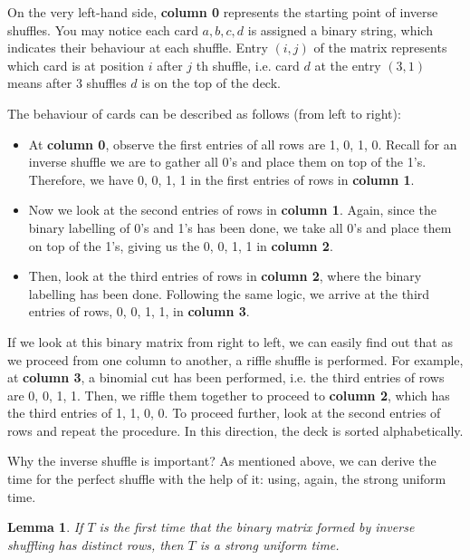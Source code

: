 \documentclass[12pt]{article}
\theoremstyle{plain}
\newtheorem{lemma}{Lemma}
\theoremstyle{definition}
\theoremstyle{remark}
\begin{document}
On the very left-hand side, \textbf{column 0} represents the starting point of inverse shuffles. You may notice each card $a,b,c,d$ is assigned a binary string, which indicates their behaviour at each shuffle. Entry $(i,j)$ of the matrix represents which card is at position $i$ after $j$ th shuffle, i.e. card $d$ at the entry $(3,1)$ means after 3 shuffles $d$ is on the top of the deck.

The behaviour of cards can be described as follows (from left to right): 
\begin{itemize}
    \item At \textbf{column 0}, observe the first entries of all rows are 1, 0, 1, 0. Recall for an inverse shuffle we are to gather all 0's and place them on top of the 1's. Therefore, we have 0, 0, 1, 1 in the first entries of rows in \textbf{column 1}.
    
    \item Now we look at the second entries of rows in \textbf{column 1}. Again, since the binary labelling of 0's and 1's has been done, we take all 0's and place them on top of the 1's, giving us the 0, 0, 1, 1 in \textbf{column 2}. 
    
    \item Then, look at the third entries of rows in \textbf{column 2}, where the binary labelling has been done. Following the same logic, we arrive at the third entries of rows, 0, 0, 1, 1, in \textbf{column 3}.
\end{itemize}

If we look at this binary matrix from right to left, we can easily find out that as we proceed from one column to another, a riffle shuffle is performed. For example, at \textbf{column 3}, a binomial cut has been performed, i.e. the third entries of rows are 0, 0, 1, 1. Then, we riffle them together to proceed to \textbf{column 2}, which has the third entries of 1, 1, 0, 0. To proceed further, look at the second entries of rows and repeat the procedure. In this direction, the deck is sorted alphabetically.

Why the inverse shuffle is important? As mentioned above, we can derive the time for the perfect shuffle with the help of it: using, again, the strong uniform time.

\begin{lemma}\cite[Lemma~9 on \pno~344]{1.1}
If $T$ is the first time that the binary matrix formed by inverse shuffling has distinct rows, then $T$ is a strong uniform time.
\end{lemma} 
\end{document}
